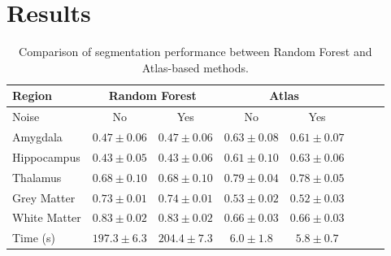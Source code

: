 \section{Results}

\setlength{\tabcolsep}{3pt}
\begin{table}[ht]
	\begin{flushleft}
		\caption{Comparison of segmentation performance between Random Forest and Atlas-based methods.}
		\begin{tabularx}{\linewidth}{Xccccccc}
			\toprule
			\multirow{2}{*}{Region} & \multicolumn{2}{c}{Random Forest} & \multicolumn{2}{c}{Atlas} \\ 
			\cmidrule(lr){2-3} \cmidrule(lr){4-5}
			\midrule
			Noise & No & Yes & No & Yes \\
			Amygdala & $0.47 \pm 0.06$ & $0.47 \pm 0.06$ & $\mathbf{0.63 \pm 0.08}$ & $0.61 \pm 0.07$ \\
			Hippocampus & $0.43 \pm 0.05$ & $0.43 \pm 0.06$ & $0.61 \pm 0.10$ & $\mathbf{0.63 \pm 0.06}$ \\
			Thalamus & $0.68 \pm 0.10$ & $0.68 \pm 0.10$ & $\mathbf{0.79\pm 0.04}$ & $0.78 \pm 0.05$ \\
			Grey Matter & $0.73 \pm 0.01$ & $\mathbf{0.74 \pm 0.01}$ & $0.53 \pm 0.02 $ & $0.52 \pm 0.03$ \\
			White Matter & $\mathbf{0.83 \pm 0.02}$ & $\mathbf{0.83 \pm 0.02}$ & $0.66 \pm 0.03$ & $0.66 \pm 0.03$ \\
			Time (s)  & $197.3 \pm 6.3$  & $204.4 \pm 7.3$  & $6.0 \pm 1.8$  & $\mathbf{5.8 \pm 0.7}$ \\
			\bottomrule
		\end{tabularx}
	\end{flushleft}	
	\label{tab:performance_comparison}
\end{table}

